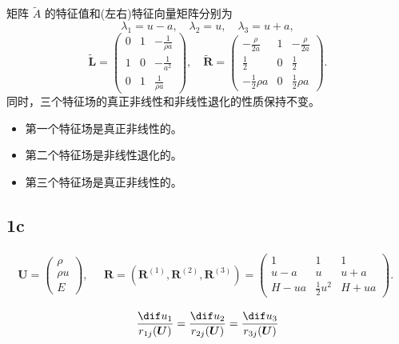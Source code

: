 \documentclass[12pt]{article}
\begin{document}
矩阵 $\widetilde{A}$ 的特征值和(左右)特征向量矩阵分别为
\begin{equation}
	\lambda_{1}= u-a, \quad \lambda_{2}=u, \quad \lambda_{3}=u+a,
\end{equation}
\begin{equation}
	\widetilde{\boldsymbol{L}}=	
	\begin{pmatrix}
		0 & 1 & -\frac{1}{\rho a} \\
	1 & 0 & -\frac{1}{a^{2}} \\
	0 & 1 & \frac{1}{\rho a}
	\end{pmatrix},\quad
	\widetilde{\boldsymbol{R}}=
	\begin{pmatrix}
		-\frac{\rho}{2 a} & 1 & -\frac{\rho}{2 a} \\
		\frac{1}{2} & 0 & \frac{1}{2} \\
		-\frac{1}{2} \rho a & 0 & \frac{1}{2} \rho a
	\end{pmatrix}.
\end{equation}
同时，三个特征场的真正非线性和非线性退化的性质保持不变。

\begin{itemize}
	\item 第一个特征场是真正非线性的。
	\item 第二个特征场是非线性退化的。
	\item 第三个特征场是真正非线性的。
\end{itemize}

\subsection{1c}


\begin{equation}
	\bm{U} = \begin{pmatrix}
		\rho \\
	\rho u \\
	E
	\end{pmatrix},\quad
	\begin{array}{c}
	\boldsymbol{R}=\left(\boldsymbol{R}^{(1)}, \boldsymbol{R}^{(2)}, \boldsymbol{R}^{(3)}\right)=\left(\begin{array}{ccc}
	1 & 1 & 1 \\
	u-a & u & u+a \\
	H-u a & \frac{1}{2} u^{2} & H+u a
	\end{array}\right).
	\end{array}
\end{equation}

\begin{equation}
	\frac{\dif u_{1}}{r_{1 j}(\boldsymbol{U})}=\frac{\dif u_{2}}{r_{2 j}(\boldsymbol{U})}=\frac{\dif u_{3}}{r_{3 j}(\boldsymbol{U})}
	\label{eq:12}
\end{equation}
\end{document}
